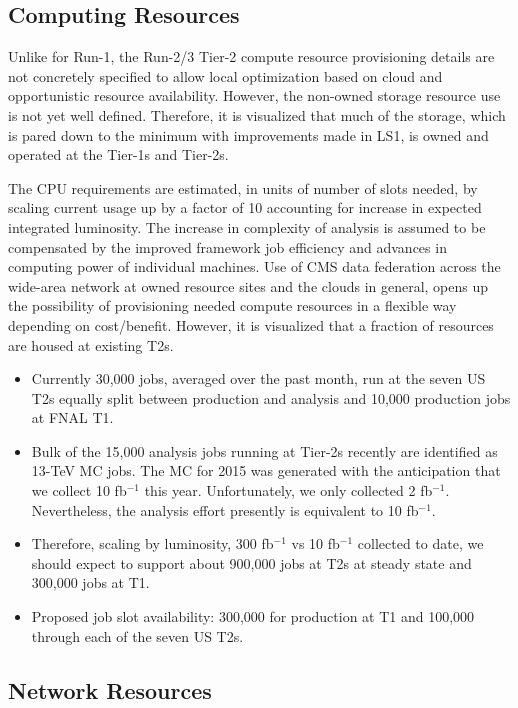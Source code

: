 \subsection{Computing Resources}

Unlike for Run-1, the Run-2/3 Tier-2 compute resource provisioning details are not 
concretely specified to allow local optimization based on cloud and opportunistic
resource availability. However, the non-owned storage resource use is not yet
well defined. Therefore, it is visualized that much of the storage, which is pared 
down to the minimum with improvements made in LS1, is owned and operated at 
the Tier-1s and Tier-2s. 

The CPU requirements are estimated, in units of number of slots needed, by scaling current 
usage up by a factor of 10 accounting for increase in expected integrated luminosity.  The 
increase in complexity of analysis is assumed to be compensated by the improved 
framework job efficiency and advances in computing power of individual machines.
Use of CMS data federation across the wide-area network at owned resource sites
and the clouds in general, opens up the possibility of provisioning needed compute
resources in a flexible way depending on cost/benefit.  However, it is visualized
that a fraction of resources are housed at existing T2s.

\begin{itemize}
\item Currently 30,000 jobs, averaged over the past month, run at the seven 
US T2s equally split between production and analysis and 10,000 production
jobs at FNAL T1.
\item Bulk of the 15,000 analysis jobs running at Tier-2s recently are 
identified as 13-TeV MC jobs.  The MC for 2015 was generated with the
anticipation that we collect 10 fb$^{-1}$ this year.  Unfortunately,
we only collected 2 fb$^{-1}$.  Nevertheless, the analysis effort 
presently is equivalent to 10 fb$^{-1}$.
\item Therefore, scaling by luminosity, 300 fb$^{-1}$ vs 10 fb$^{-1}$ collected 
to date, we should expect to support about 900,000 jobs at T2s at steady state 
and 300,000 jobs at T1.
\item Proposed job slot availability: 300,000 for production at T1 and 100,000 through each of the seven US T2s.
\end{itemize}

\subsection{Network Resources}

